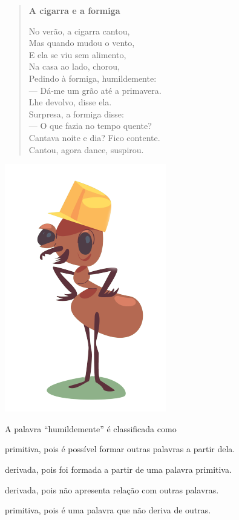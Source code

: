\begin{myquote}
\begin{minipage}{.9\textwidth}
\begin{verse}
\textbf{A cigarra e a formiga}

No verão, a cigarra cantou,\\
Mas quando mudou o vento,\\
E ela se viu sem alimento,\\ 
Na casa ao lado, chorou,\\
Pedindo à formiga, humildemente:\\

--- Dá-me um grão até a primavera.\\
Lhe devolvo, disse ela.\\
Surpresa, a formiga disse:\\

--- O que fazia no tempo quente?\\
Cantava noite e dia? Fico contente.\\Cantou, agora dance, suspirou.\\

\end{verse}
\end{minipage}
\begin{minipage}{.1\textwidth}
\end{minipage}
\includegraphics[width=.2\textwidth]{./media/image1f.png}
\end{myquote}

A palavra ``humildemente'' é classificada como

\begin{escolha}[itemsep=-5pt]
\item primitiva, pois é possível formar outras palavras a partir dela.

\item derivada, pois foi formada a partir de uma palavra primitiva.

\item derivada, pois não apresenta relação com outras palavras.

\item primitiva, pois é uma palavra que não deriva de outras.
\end{escolha}

